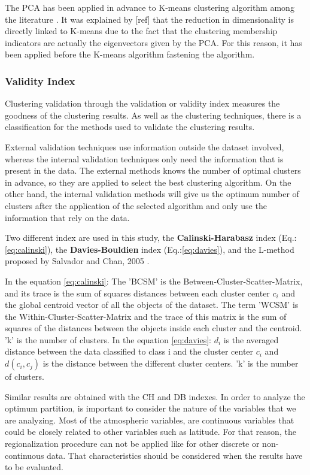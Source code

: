 The PCA has been applied in advance to K-means clustering algorithm among the literature \cite*{Ding2004}. It was explained by [ref] that the reduction in dimensionality is directly linked to K-means due to the fact that the clustering membership indicators are actually the eigenvectors given by the PCA. For this reason, it has been applied before the K-means algorithm fastening the algorithm.

\subsubsection{Validity Index}

Clustering validation through the validation or validity index measures the goodness of the clustering results. As well as the clustering techniques, there is a classification for the methods used to validate the clustering results.

External validation techniques use information outside the dataset involved, whereas the internal validation techniques only need the information that is present in the data. The external methods knows the number of optimal clusters in advance, so they are applied to select the best clustering algorithm. On the other hand, the internal validation methods will give us the optimum number of clusters after the application of the selected algorithm and only use the information that rely on the data.

Two different index are used in this study, the \textbf{Calinski-Harabasz} index (Eq.:\ref{eq:calinski}), the \textbf{Davies-Bouldien} index (Eq.:\ref{eq:davies}), and the L-method proposed by Salvador and Chan, 2005 \cite*{CalinskiH, davies1979cluster, Salvador2004}.

In the equation \ref{eq:calinski}: The 'BCSM' is the Between-Cluster-Scatter-Matrix, and its trace is the sum of squares distances between each cluster center $c_{i}$ and the global centroid vector of all the objects of the dataset. The term 'WCSM' is the Within-Cluster-Scatter-Matrix and the trace of this matrix is the sum of squares of the distances between the objects inside each cluster and the centroid. 'k' is the number of clusters. In the equation \ref{eq:davies}: $d_{i}$ is the averaged distance between the data classified to class i and the cluster center $c_{i}$ and $d(c_i,c_j)$ is the distance between the different cluster centers. 'k' is the number of clusters. 

Similar results are obtained with the CH and DB indexes. In order to analyze the optimum partition, is important to consider the nature of the variables that we are analyzing. Most of the atmospheric variables, are continuous variables that could be closely related to other variables such as latitude. For that reason, the regionalization procedure can not be applied like for other discrete or non-continuous data. That characteristics should be considered when the results have to be evaluated.

